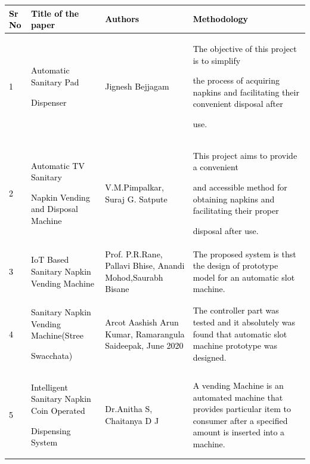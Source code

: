 \documentclass[letterpaper]{article}
\begin{document}
\begin{flushleft}
\tablefirsthead{}
\tablehead{}
\tabletail{}
\tablelasttail{}
\begin{supertabular}{|m{0.47815987in}|m{1.7254599in}|m{1.6455599in}|m{2.91566in}|}
\hline
\textbf{\textcolor{black}{Sr No}} &
\textbf{\textcolor{black}{Title of the paper}} &
\textbf{\textcolor{black}{Authors}} &
\textbf{\textcolor{black}{Methodology}}\\\hline
\textcolor{black}{1} &
\textcolor{black}{Automatic Sanitary Pad}

\textcolor{black}{Dispenser} &
\textcolor{black}{Jignesh Bejjagam} &
\textcolor{black}{The objective of this project is to simplify}

\textcolor{black}{the process of acquiring napkins and facilitating their convenient disposal after}

\textcolor{black}{use.}\\\hline
\textcolor{black}{2} &
\textcolor{black}{Automatic TV Sanitary}

\textcolor{black}{Napkin Vending and Disposal Machine} &
\textcolor{black}{V.M.Pimpalkar, Suraj G. Satpute} &
\textcolor{black}{This project aims to provide a convenient}

\textcolor{black}{and accessible method for obtaining napkins and facilitating their proper}

\textcolor{black}{disposal after use.}\\\hline
\textcolor{black}{3} &
\textcolor{black}{IoT Based Sanitary Napkin Vending Machine} &
\textcolor{black}{Prof. P.R.Rane, Pallavi Bhise, Anandi Mohod,Saurabh Bisane} &
\textcolor{black}{The proposed system is thst the design of prototype model for an automatic slot machine.}\\\hline
\textcolor{black}{4} &
\textcolor{black}{Sanitary Napkin Vending Machine(Stree}

\textcolor{black}{Swacchata)} &
\textcolor{black}{Arcot Aashish Arun Kumar, Ramarangula Saideepak, June 2020} &
\textcolor{black}{The controller part was tested and it absolutely was found that automatic slot machine prototype was
designed.}\\\hline
\textcolor{black}{5} &
\textcolor{black}{Intelligent Sanitary Napkin Coin Operated}

\textcolor{black}{Dispensing System} &
\textcolor{black}{Dr.Anitha S, Chaitanya D J} &
\textcolor{black}{A vending Machine is an automated machine that provides particular item to consumer after a specified
amount is inserted into a machine.}\\\hline
\end{supertabular}
\end{flushleft}
\clearpage\setcounter{page}{1}\pagestyle{Convertedxi}
\end{document}
